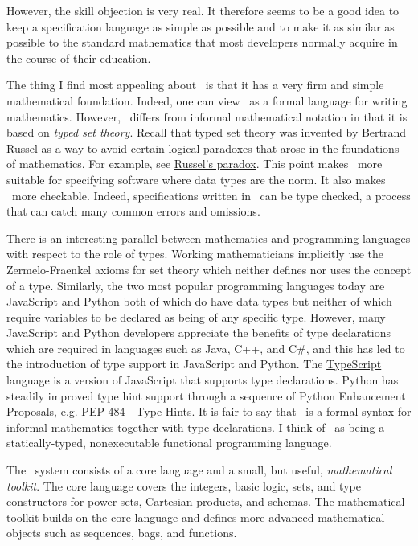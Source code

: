 \documentclass{amsart}
\begin{document}
However, the skill objection is very real.
It therefore seems to be a good idea to keep a specification language as simple as possible and to make it as
similar as possible to the standard mathematics that most developers normally acquire in the course of their education.

The thing I find most appealing about \ZN\ is that it has a very firm and simple mathematical foundation.
Indeed, one can view \ZN\ as a formal language for writing mathematics. 
However, \ZN\ differs from informal mathematical notation in that it is based on \emph{typed set theory}.
Recall that typed set theory was invented by Bertrand Russel as a way to avoid certain logical paradoxes
that arose in the foundations of mathematics.
For example, see \href{https://en.wikipedia.org/wiki/Russell's_paradox}{Russel's paradox}.
This point makes \ZN\ more suitable for specifying software where data types are the norm.
It also makes \ZN\ more checkable. Indeed, specifications written in \ZN\ can be type checked, a process
that can catch many common errors and omissions.

There is an interesting parallel between mathematics and programming languages with respect to the role of types.
Working mathematicians implicitly use the Zermelo-Fraenkel axioms for set theory which neither defines nor uses the concept of a type.
Similarly, the two most popular programming languages today are JavaScript and Python 
both of which do have data types but neither of which
require variables to be declared as being of any specific type. 
However, many JavaScript and Python developers appreciate the benefits of type declarations which are required in languages such as
Java, C++, and C\#, and this has led to the introduction of type support in JavaScript and Python. 
The \href{https://www.typescriptlang.org}{TypeScript} language is a version of JavaScript that supports type declarations. 
Python has steadily improved type hint support through a sequence of Python
Enhancement Proposals, e.g. \href{https://peps.python.org/pep-0484/}{PEP 484 - Type Hints}.
It is fair to say that \ZN\ is a formal syntax for informal mathematics together with type declarations.
I think of \ZN\ as being a statically-typed, nonexecutable functional programming language.


The \ZN\ system consists of a core language and a small, but useful, \emph{mathematical toolkit}.
The core language covers the integers, basic logic, sets, and type constructors for power sets, Cartesian products, and schemas.
The mathematical toolkit builds on the core language and defines more advanced mathematical objects such as sequences, bags, and
functions.
\end{document}
